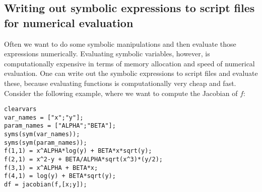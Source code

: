 \subsection*{Writing out symbolic expressions to script files for numerical evaluation}
Often we want to do some symbolic manipulations and then evaluate those expressions numerically.
Evaluating symbolic variables, however, is computationally expensive
  in terms of memory allocation and speed of numerical evaluation.
One can write out the symbolic expressions to script files and evaluate these,
  because evaluating functions is computationally very cheap and fast.
Consider the following example, where we want to compute the Jacobian of \(f\):
\begin{lstlisting}[style=Matlab-editor,basicstyle=\mlttfamily\scriptsize]
clearvars
var_names = ["x";"y"];
param_names = ["ALPHA";"BETA"];
syms(sym(var_names));
syms(sym(param_names));
f(1,1) = x^ALPHA*log(y) + BETA*x*sqrt(y);
f(2,1) = x^2-y + BETA/ALPHA*sqrt(x^3)*(y/2);
f(3,1) = x^ALPHA + BETA*x;
f(4,1) = log(y) + BETA*sqrt(y);
df = jacobian(f,[x;y]);
\end{lstlisting}

\newpage

